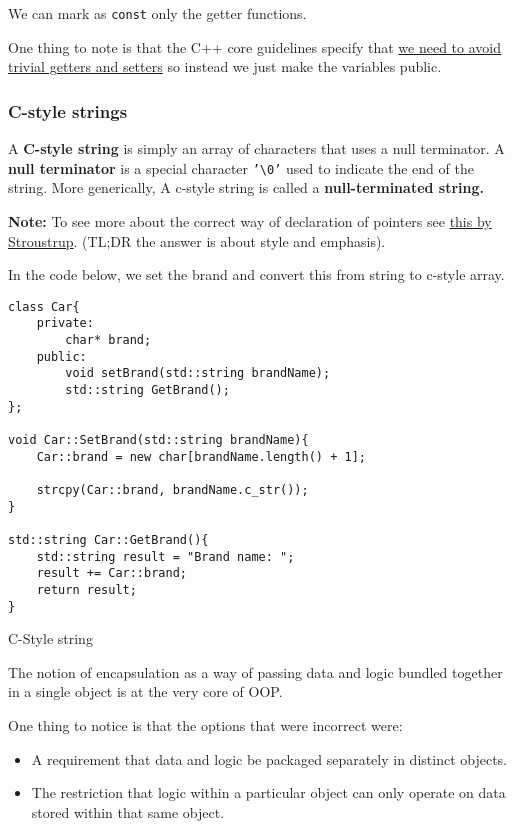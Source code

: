 \documentclass[11pt, a4paper]{article}
\begin{document}
We can mark as \texttt{const} only the getter functions. 


One thing to note is that the C++ core guidelines specify that \href{https://github.com/isocpp/CppCoreGuidelines/blob/master/CppCoreGuidelines.md#Rh-get}{we need to avoid trivial getters and setters} so instead we just make the variables public.


\subsubsection{C-style strings}%
\label{ssub:c_style_strings}


A \textbf{C-style string} is simply an array of characters that uses a null terminator. A \textbf{null terminator} is a special character \texttt{'\textbackslash0'} used to indicate the end of the string. More generically, A c-style string is called a \textbf{null-terminated string.}



\textbf{Note:}
To see more about the correct way of declaration of pointers see \href{http://www.stroustrup.com/bs_faq2.html#whitespace}{this by Stroustrup}. (TL;DR the answer is about style and emphasis).


In the code below, we set the brand and convert this from string to c-style array.

\begin{listing}[hbt!]
\begin{verbatim}
class Car{
	private:
		char* brand;
	public:
		void setBrand(std::string brandName);
		std::string GetBrand();
};

void Car::SetBrand(std::string brandName){
	Car::brand = new char[brandName.length() + 1];

	strcpy(Car::brand, brandName.c_str());
}

std::string Car::GetBrand(){
	std::string result = "Brand name: ";
	result += Car::brand;
	return result;
}

\end{verbatim}
\caption{C-Style string}
\label{lst:ctyle string}
\end{listing}




The notion of encapsulation as a way of passing data and logic bundled together in a single object is at the very core of OOP. 

One thing to notice is that the options that were incorrect were:
\begin{itemize}
	\item A requirement that data and logic be packaged separately in distinct objects.
	\item The restriction that logic within a particular object can only operate on data stored within that same object.
\end{itemize}
\end{document}
